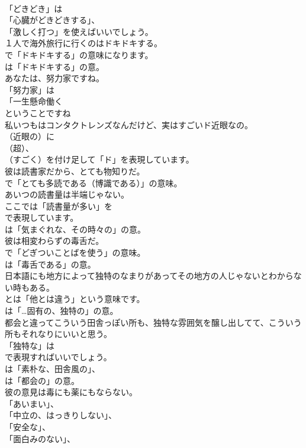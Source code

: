 \documentclass[8pt]{extreport}
\begin{document}
\begin{CJK}{UTF8}{min}
\\	「どきどき」は
\\	「心臓がどきどきする」、
\\	「激しく打つ」を使えばいいでしょう。	
\\	１人で海外旅行に行くのはドキドキする。 
\\	で「ドキドキする」の意味になります。
\\	は「ドキドキする」の意。	
\\	あなたは、努力家ですね。 
\\	「努力家」は
\\	「一生懸命働く
\\	ということですね
\\	私いつもはコンタクトレンズなんだけど、実はすごいド近眼なの。 
\\	（近眼の）に 
\\	（超）、
\\	（すごく）を付け足して「ド」を表現しています。	
\\	彼は読書家だから、とても物知りだ。 
\\	で「とても多読である（博識である）」の意味。	
\\	あいつの読書量は半端じゃない。 
\\	ここでは「読書量が多い」を 
\\	で表現しています。
\\	は「気まぐれな、その時々の」の意。	
\\	彼は相変わらずの毒舌だ。 
\\	で「どぎついことばを使う」の意味。
\\	は「毒舌である」の意。	
\\	日本語にも地方によって独特のなまりがあってその地方の人じゃないとわからない時もある。 
\\	とは「他とは違う」という意味です。
\\	は「…固有の、独特の」の意。	
\\	都会と違ってこういう田舎っぽい所も、独特な雰囲気を醸し出してて、こういう所もそれなりにいいと思う。 
\\	「独特な」は 
\\	で表現すればいいでしょう。
\\	は「素朴な、田舎風の」、
\\	は「都会の」の意。	
\\	彼の意見は毒にも薬にもならない。 
\\	「あいまい」、
\\	「中立の、はっきりしない」、
\\	「安全な」、
\\	「面白みのない」、

\end{CJK}
\end{document}
